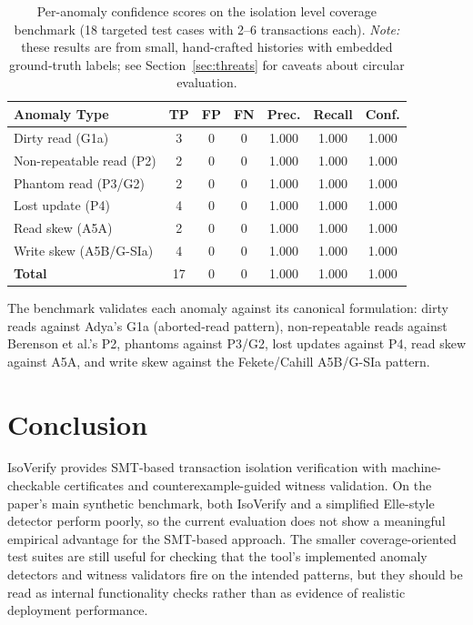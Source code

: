 \documentclass[11pt]{article}
\begin{document}
\begin{table}[t]
\centering
\caption{Per-anomaly confidence scores on the isolation level coverage
  benchmark (18 targeted test cases with 2--6 transactions each).
  \emph{Note:} these results are from small, hand-crafted histories
  with embedded ground-truth labels; see Section~\ref{sec:threats}
  for caveats about circular evaluation.}
\label{tab:confidence}
\begin{tabular}{lcccccc}
\toprule
\textbf{Anomaly Type} & \textbf{TP} & \textbf{FP} & \textbf{FN} & \textbf{Prec.} & \textbf{Recall} & \textbf{Conf.} \\
\midrule
Dirty read (G1a)           & 3 & 0 & 0 & 1.000 & 1.000 & 1.000 \\
Non-repeatable read (P2)   & 2 & 0 & 0 & 1.000 & 1.000 & 1.000 \\
Phantom read (P3/G2)       & 2 & 0 & 0 & 1.000 & 1.000 & 1.000 \\
Lost update (P4)           & 4 & 0 & 0 & 1.000 & 1.000 & 1.000 \\
Read skew (A5A)            & 2 & 0 & 0 & 1.000 & 1.000 & 1.000 \\
Write skew (A5B/G-SIa)     & 4 & 0 & 0 & 1.000 & 1.000 & 1.000 \\
\midrule
\textbf{Total}             & 17 & 0 & 0 & 1.000 & 1.000 & 1.000 \\
\bottomrule
\end{tabular}
\end{table}

The benchmark validates each anomaly against its canonical formulation:
dirty reads against Adya's G1a (aborted-read pattern), non-repeatable reads
against Berenson et al.'s P2, phantoms against P3/G2, lost updates against
P4, read skew against A5A, and write skew against the Fekete/Cahill
A5B/G-SIa pattern.

\section{Conclusion}

IsoVerify provides SMT-based transaction isolation verification with
machine-checkable certificates and counterexample-guided witness validation.
On the paper's main synthetic benchmark, both IsoVerify and a simplified
Elle-style detector perform poorly, so the current evaluation does not show a
meaningful empirical advantage for the SMT-based approach.  The smaller
coverage-oriented test suites are still useful for checking that the tool's
implemented anomaly detectors and witness validators fire on the intended
patterns, but they should be read as internal functionality checks rather than
as evidence of realistic deployment performance.
\end{document}
